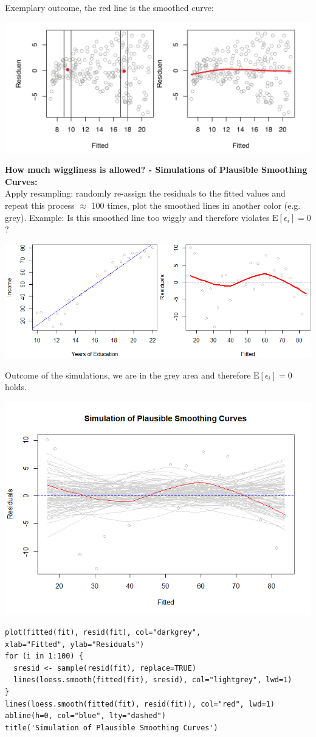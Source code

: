 \documentclass[11pt]{article}
\newcommand*\ev[1]{\mathrel{\text{E}\left[#1\right]}}
\begin{document}
Exemplary outcome, the red line is the smoothed curve:
\begin{center}
	\includegraphics[width=0.8\linewidth]{img/LOESS_smoother}
\end{center}
\noindent
\textbf{How much wiggliness is allowed? - Simulations of Plausible Smoothing Curves:}\\
Apply resampling: randomly re-assign the residuals to the fitted values and repeat this process $\approx$ 100 times, plot the smoothed lines in another color (e.g. grey). Example: Is this smoothed line too wiggly and therefore violates $\ev{\epsilon_i} = 0$?
\begin{center}
	\includegraphics[width=0.6\linewidth]{img/tukey-anscombe}
\end{center}
Outcome of the simulations, we are in the grey area and therefore $\ev{\epsilon_i} = 0$ holds.
\begin{center}
	\includegraphics[width=0.6\linewidth]{img/simulation-of-Plausible-Smoothing-Curves}
\end{center}


\begin{verbatim}
plot(fitted(fit), resid(fit), col="darkgrey",
xlab="Fitted", ylab="Residuals")
for (i in 1:100) {
  sresid <- sample(resid(fit), replace=TRUE)
  lines(loess.smooth(fitted(fit), sresid), col="lightgrey", lwd=1) 
}
lines(loess.smooth(fitted(fit), resid(fit)), col="red", lwd=1) 
abline(h=0, col="blue", lty="dashed")
title('Simulation of Plausible Smoothing Curves')
\end{verbatim}
\end{document}
